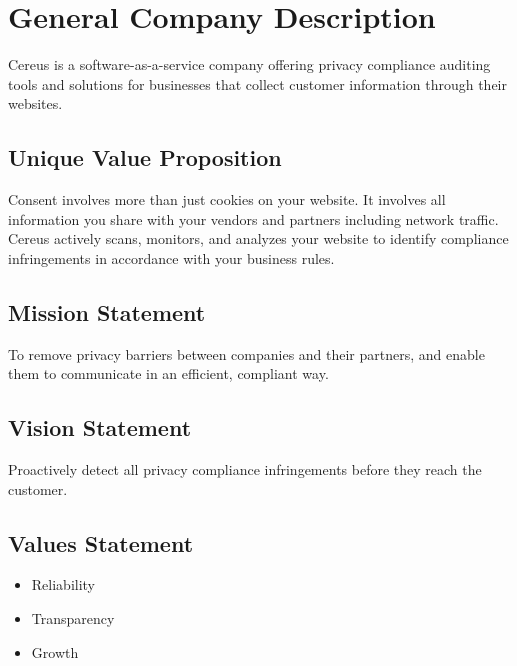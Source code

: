 {\let\cleardoublepage\relax \chapter{General Company Description}}

Cereus is a software-as-a-service company offering privacy compliance auditing tools and solutions for businesses that collect customer information through their websites.

{\let\clearpage\relax \section{Unique Value Proposition}}

Consent involves more than just cookies on your website. It involves all information you share with your vendors and partners including network traffic. Cereus actively scans, monitors, and analyzes your website to identify compliance infringements in accordance with your business rules.

{\let\clearpage\relax \section{Mission Statement}}

To remove privacy barriers between companies and their partners, and enable them to communicate in an efficient, compliant way.


\section{Vision Statement}

Proactively detect all privacy compliance infringements before they reach the customer. 

\section{Values Statement}

\begin{itemize}
  \item Reliability
  \item Transparency
  \item Growth
\end{itemize}

